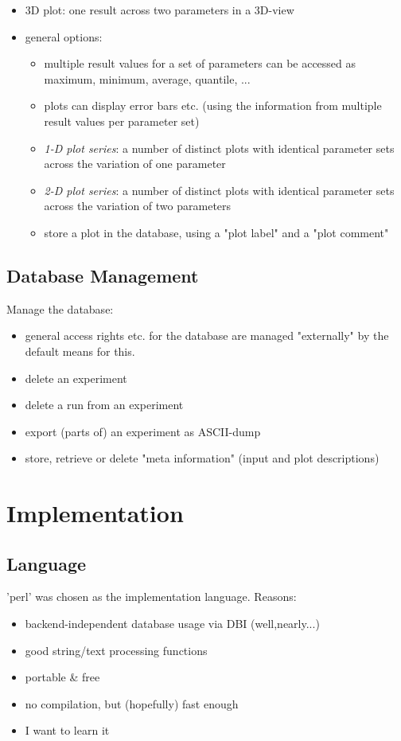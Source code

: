 \documentclass[12pt,a4paper]{article}
\begin{document}
\begin{description}
\begin{itemize}
     \item 3D plot: one result across two parameters in a 3D-view
     \item general options:
     \begin{itemize}
       \item multiple result values for a set of parameters can 
         be accessed as maximum, minimum, average, quantile, ...
       \item plots can display error bars etc. (using the information from multiple
         result values per parameter set)
       \item \emph{1-D plot series}: a number of distinct plots with identical parameter sets
         across the variation of one parameter
       \item \emph{2-D plot series}: a number of distinct plots with identical parameter sets
         across the variation of two parameters
       \item store a plot in the database, using a "plot label" and a "plot comment"
     \end{itemize}
   \end{itemize}
   \end{description} 

\subsection{Database Management}
\label{sec:db-mngmt}
Manage the database:
\begin{itemize}
\item general access rights etc. for the database are managed "externally" by
     the default means for this.
\item delete an experiment
\item delete a run from an experiment
\item export (parts of) an experiment as ASCII-dump
\item store, retrieve or delete "meta information" (input and plot descriptions)
\end{itemize}


\section{Implementation}

\subsection{Language}
'perl' was chosen as the implementation language. Reasons:
\begin{itemize}
 \item backend-independent database usage via DBI (well,nearly...)
 \item good string/text processing functions
 \item portable \& free
 \item no compilation, but (hopefully) fast enough
 \item I want to learn it
\end{itemize}
\end{document}
